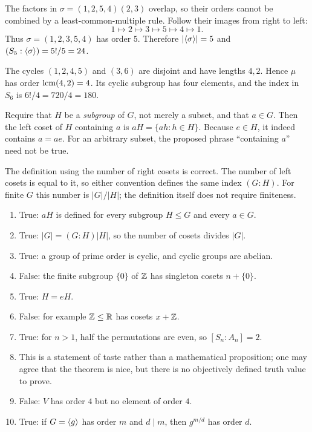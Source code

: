 The factors in $\sigma=(1,2,5,4)(2,3)$ overlap, so their orders cannot be combined by a least-common-multiple rule. Follow their images from right to left:
\[1\mapsto2\mapsto3\mapsto5\mapsto4\mapsto1.\]
Thus $\sigma=(1,2,3,5,4)$ has order $5$. Therefore $|\langle \sigma\rangle|=5$ and $(S_5:\langle \sigma\rangle)=5!/5=24$.

The cycles $(1,2,4,5)$ and $(3,6)$ are disjoint and have lengths $4,2$. Hence $\mu$ has order $\operatorname{lcm}(4,2)=4$. Its cyclic subgroup has four elements, and the index in $S_6$ is $6!/4=720/4=180$.

Require that $H$ be a \emph{subgroup} of $G$, not merely a subset, and that $a\in G$. Then the left coset of $H$ containing $a$ is $aH=\{ah:h\in H\}$. Because $e\in H$, it indeed contains $a=ae$. For an arbitrary subset, the proposed phrase ``containing $a$'' need not be true.

The definition using the number of right cosets is correct. The number of left cosets is equal to it, so either convention defines the same index $(G:H)$. For finite $G$ this number is $|G|/|H|$; the definition itself does not require finiteness.

\begin{enumerate}[label=(\alph*)]
\item True: $aH$ is defined for every subgroup $H\le G$ and every $a\in G$.
\item True: $|G|=(G:H)|H|$, so the number of cosets divides $|G|$.
\item True: a group of prime order is cyclic, and cyclic groups are abelian.
\item False: the finite subgroup $\{0\}$ of $\mathbb{Z}$ has singleton cosets $n+\{0\}$.
\item True: $H=eH$.
\item False: for example $\mathbb{Z}\le\mathbb{R}$ has cosets $x+\mathbb{Z}$.
\item True: for $n>1$, half the permutations are even, so $[S_n:A_n]=2$.
\item This is a statement of taste rather than a mathematical proposition; one may agree that the theorem is nice, but there is no objectively defined truth value to prove.
\item False: $V$ has order $4$ but no element of order $4$.
\item True: if $G=\langle g\rangle$ has order $m$ and $d\mid m$, then $g^{m/d}$ has order $d$.
\end{enumerate}

